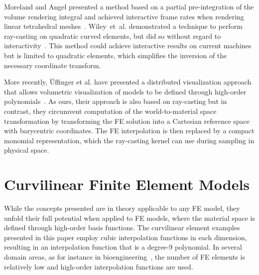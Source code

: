 \documentclass[journal]{vgtc}                %
\begin{document}
Moreland and Angel presented a method based on a partial pre-integration of the volume rendering integral and achieved interactive frame rates when rendering linear tetrahedral meshes~\cite{morelandVolRen04}. Wiley~et~al. demonstrated a technique to perform ray-casting on quadratic curved elements, but did so without regard to interactivity~\cite{wileyraycasting04}. This method could achieve interactive results on current machines but is limited to quadratic elements, which simplifies the inversion of the necessary coordinate transform.

More recently, {\"U}ffinger et al. have presented a distributed visualization approach that allows volumetric visualization of models to be defined through high-order polynomials~\cite{uffinger10femraycasting}. As ours, their approach is also based on ray-casting but in contrast, they circumvent computation of the world-to-material space transformation by transforming the FE solution into a Cartesian reference space with barycentric coordinates. The FE interpolation is then replaced by a compact monomial representation, which the ray-casting kernel can use during sampling in physical space.
%
%
%
\section{Curvilinear Finite Element Models}\label{sec:theory}
While the concepts presented are in theory applicable to any FE model, they unfold their full potential when applied to FE models, where the material space is defined through high-order basis functions. The curvilinear element examples presented in this paper employ cubic interpolation functions in each dimension, resulting in an interpolation function that is a degree-9 polynomial. In several domain areas, as for instance in bioengineering~\cite{lee10deformation,wuensche03deformation}, the number of FE elements is relatively low and high-order interpolation functions are used.
\end{document}
